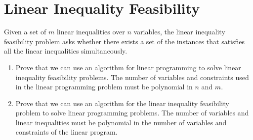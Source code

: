 \documentclass[11pt]{article}
\begin{document}
  \section{Linear Inequality Feasibility}
    Given a set of $m$ linear inequalities over $n$ variables, the linear inequality feasibility problem asks whether there exists a set of the instances that satisfies all the linear inequalities simultaneously.
    \begin{enumerate}[leftmargin=*]
      \item Prove that we can use an algorithm for linear programming to solve linear inequality feasibility problems. The number of variables and constraints used in the linear programming problem must be polynomial in $n$ and $m$.
      \item Prove that we can use an algorithm for the linear inequality feasibility problem to solve linear programming problems. The number of variables and linear inequalities must be polynomial in the number of variables and constraints of the linear program.
    \end{enumerate}
\end{document}
